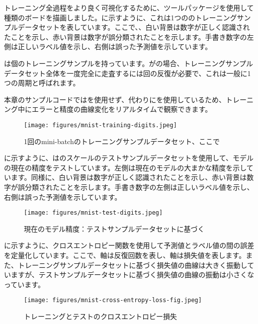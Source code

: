 \begin{content}
\begin{content}
トレーニング全過程をより良く可視化するために、ツールパッケージを使用して種類のボードを描画しました。に示すように、これは1つののトレーニングサンプルデータセットを表しています。ここで、、白い背景は数字が正しく認識されたことを示し、赤い背景は数字が誤分類されたことを示します。手書き数字の左側は正しいラベル値を示し、右側は誤った予測値を示しています。

は個のトレーニングサンプルを持っています。がの場合、トレーニングサンプルデータセット全体を一度完全に走査するには回の反復が必要で、これは一般に1つの周期と呼ばれます。

\begin{remark}
本章のサンプルコードではを使用せず、代わりにを使用しているため、トレーニング中にエラーと精度の曲線変化をリアルタイムで観察できます。
\end{remark}

\begin{figure}[H]
\centering
\texttt{[image: figures/mnist-training-digits.jpeg]}
\caption{1回のmini-batchのトレーニングサンプルデータセット、ここで}
 \label{fig:mnist-training-digits}
\end{figure}

に示すように、はのスケールのテストサンプルデータセットを使用して、モデルの現在の精度をテストしています。左側は現在のモデルの大まかな精度を示しています。同様に、白い背景は数字が正しく認識されたことを示し、赤い背景は数字が誤分類されたことを示します。手書き数字の左側は正しいラベル値を示し、右側は誤った予測値を示しています。

\begin{figure}[H]
\centering
\texttt{[image: figures/mnist-test-digits.jpeg]}
\caption{現在のモデル精度：テストサンプルデータセットに基づく}
 \label{fig:mnist-test-digits}
\end{figure}

に示すように、クロスエントロピー関数を使用して予測値とラベル値の間の誤差を定量化しています。ここで、軸は反復回数を表し、軸は損失値を表します。また、トレーニングサンプルデータセットに基づく損失値の曲線は大きく振動していますが、テストサンプルデータセットに基づく損失値の曲線の振動は小さくなっています。

\begin{figure}[H]
\centering
\texttt{[image: figures/mnist-cross-entropy-loss-fig.jpeg]}
\caption{トレーニングとテストのクロスエントロピー損失}
 \label{fig:mnist-cross-entropy-loss-fig}
\end{figure}


\end{content}
\end{content}

